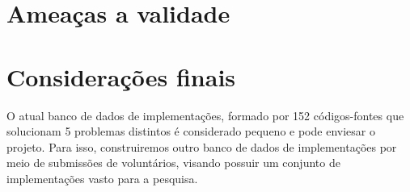 %	
%	
%
%
%

	\section{Ameaças a validade}
	
	

	\section{Considerações finais}
	
		O atual banco de dados de implementações, formado por 152 códigos-fontes que
		solucionam 5 problemas distintos é considerado pequeno e pode enviesar o
		projeto. Para isso, construiremos outro banco de dados de implementações
		por meio de submissões de voluntários, visando possuir um conjunto de
		implementações vasto para a pesquisa.
